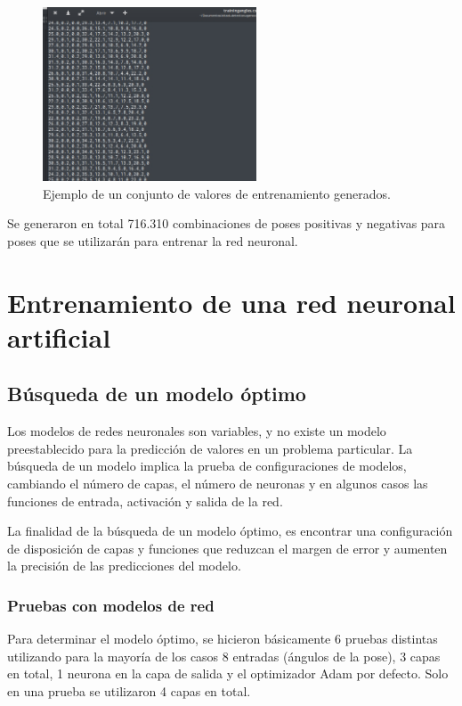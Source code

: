 \documentclass[a4paper,12pt,oneside,spanish]{book}
\begin{document}
\begin{figure}[h!]
	\includegraphics[width=180pt]{Imagenes/dataset2.jpg}
	\centering	
	\caption{Ejemplo de un conjunto de valores de entrenamiento generados.}
	\label{fig:dataset2}
\end{figure}

Se generaron en total 716.310 combinaciones de poses positivas y negativas para poses que se utilizarán para entrenar la red neuronal.

\section{Entrenamiento de una red neuronal artificial}
\subsection{Búsqueda de un modelo óptimo}
Los modelos de redes neuronales son variables, y no existe un modelo preestablecido para la predicción de valores en un problema particular. La búsqueda de un modelo implica la prueba de configuraciones de modelos, cambiando el número de capas, el número de neuronas y en algunos casos las funciones de entrada, activación y salida de la red.\par

La finalidad de la búsqueda de un modelo óptimo, es encontrar una configuración de disposición de capas y funciones que reduzcan el margen de error y aumenten la precisión de las predicciones del modelo.\par

\subsubsection{Pruebas con modelos de red}
Para determinar el modelo óptimo, se hicieron básicamente 6 pruebas distintas utilizando para la mayoría de los casos 8 entradas (ángulos de la pose), 3 capas en total, 1 neurona en la capa de salida y el optimizador Adam por defecto. Solo en una prueba se utilizaron 4 capas en total.\par
\end{document}
